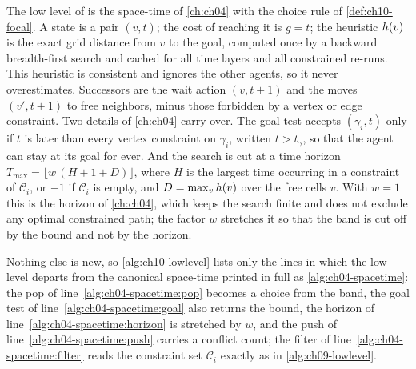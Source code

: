 The low level of \ecbs is the space-time \astar of \cref{ch:ch04} with the
choice rule of \cref{def:ch10-focal}. A state is a pair $(v, t)$; the cost of
reaching it is $g = t$; the heuristic $h(v)$ is the exact grid distance
from $v$ to the goal, computed once by a backward breadth-first search and
cached for all time layers and all constrained re-runs. This heuristic is
consistent and ignores the other agents, so it never overestimates. Successors
are the wait action $(v, t+1)$ and the moves $(v', t+1)$ to free neighbors,
minus those forbidden by a vertex or edge constraint. Two details of
\cref{ch:ch04} carry over. The goal test accepts $(\gamma_i, t)$ only if $t$ is
later than every vertex constraint on $\gamma_i$, written $t > t_\gamma$, so
that the agent can stay at its goal for ever. And the search is cut at a time
horizon $T_{\max} = \lfloor w\,(H + 1 + D) \rfloor$, where $H$ is the largest
time occurring in a constraint of $\mathcal{C}_i$, or $-1$ if $\mathcal{C}_i$
is empty, and $D = \max_v h(v)$ over the free cells $v$. With $w = 1$
this is the horizon of \cref{ch:ch04}, which keeps the search finite and does
not exclude any optimal constrained path; the factor $w$ stretches it so that
the band is cut off by the bound and not by the horizon.

Nothing else is new, so \cref{alg:ch10-lowlevel} lists only the lines in which
the low level departs from the canonical space-time \astar printed in full as
\cref{alg:ch04-spacetime}: the pop of line~\ref{alg:ch04-spacetime:pop} becomes
a choice from the band, the goal test of line~\ref{alg:ch04-spacetime:goal}
also returns the bound, the horizon of line~\ref{alg:ch04-spacetime:horizon} is
stretched by $w$, and the push of line~\ref{alg:ch04-spacetime:push} carries a
conflict count; the filter of line~\ref{alg:ch04-spacetime:filter} reads the
constraint set $\mathcal{C}_i$ exactly as in \cref{alg:ch09-lowlevel}.

